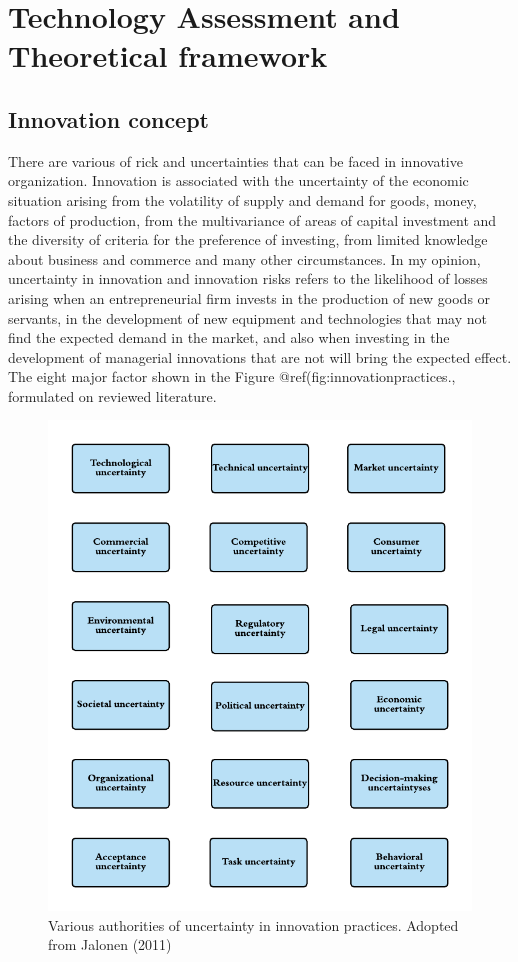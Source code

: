 \documentclass[12pt,twoside]{reedthesis}
\begin{document}
\clearpage

\hypertarget{technology-assessment-and-theoretical-framework}{%
\chapter{Technology Assessment and Theoretical framework}\label{technology-assessment-and-theoretical-framework}}

\hypertarget{innovation-concept}{%
\section{Innovation concept}\label{innovation-concept}}

There are various of rick and uncertainties that can be faced in innovative organization. Innovation is associated with the uncertainty of the economic situation arising from the volatility of supply and demand for goods, money, factors of production, from the multivariance of areas of capital investment and the diversity of criteria for the preference of investing, from limited knowledge about business and commerce and many other circumstances. In my opinion, uncertainty in innovation and innovation risks refers to the likelihood of losses arising when an entrepreneurial firm invests in the production of new goods or servants, in the development of new equipment and technologies that may not find the expected demand in the market, and also when investing in the development of managerial innovations that are not will bring the expected effect. The eight major factor shown in the Figure @ref(fig:innovationpractices., formulated on reviewed literature.
\begin{figure}[h]

{\centering \includegraphics[width=0.8\linewidth,]{figure/4} 

}

\caption{Various authorities of uncertainty in innovation practices. Adopted from Jalonen (2011)}\label{fig:innovationpractices}
\end{figure}
\end{document}
